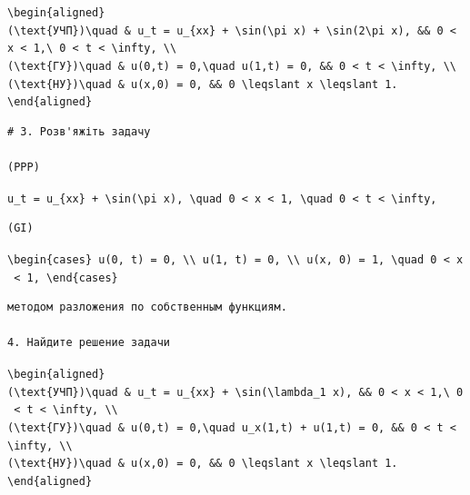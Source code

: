 \documentclass[
  ukrainian,
]{article}
\begin{document}
\texttt{\textbackslash{}begin\{aligned\}}
\texttt{(\textbackslash{}text\{УЧП\})\textbackslash{}quad\ \&\ u\_t\ =\ u\_\{xx\}\ +\ \textbackslash{}sin(\textbackslash{}pi\ x)\ +\ \textbackslash{}sin(2\textbackslash{}pi\ x),\ \&\&\ 0\ \textless{}\ x\ \textless{}\ 1,\textbackslash{}\ 0\ \textless{}\ t\ \textless{}\ \textbackslash{}infty,\ \textbackslash{}\textbackslash{}}
\texttt{(\textbackslash{}text\{ГУ\})\textbackslash{}quad\ \&\ u(0,t)\ =\ 0,\textbackslash{}quad\ u(1,t)\ =\ 0,\ \&\&\ 0\ \textless{}\ t\ \textless{}\ \textbackslash{}infty,\ \textbackslash{}\textbackslash{}}
\texttt{(\textbackslash{}text\{НУ\})\textbackslash{}quad\ \&\ u(x,0)\ =\ 0,\ \&\&\ 0\ \textbackslash{}leqslant\ x\ \textbackslash{}leqslant\ 1.}
\texttt{\textbackslash{}end\{aligned\}}

\begin{verbatim}
# 3. Розв'яжіть задачу

(PPP)
\end{verbatim}

\texttt{u\_t\ =\ u\_\{xx\}\ +\ \textbackslash{}sin(\textbackslash{}pi\ x),\ \textbackslash{}quad\ 0\ \textless{}\ x\ \textless{}\ 1,\ \textbackslash{}quad\ 0\ \textless{}\ t\ \textless{}\ \textbackslash{}infty,}

\begin{verbatim}
(GI)
\end{verbatim}

\texttt{\textbackslash{}begin\{cases\}\ u(0,\ t)\ =\ 0,\ \textbackslash{}\textbackslash{}\ u(1,\ t)\ =\ 0,\ \textbackslash{}\textbackslash{}\ u(x,\ 0)\ =\ 1,\ \textbackslash{}quad\ 0\ \textless{}\ x\ \textless{}\ 1,\ \textbackslash{}end\{cases\}}

\begin{verbatim}
методом разложения по собственным функциям.

4. Найдите решение задачи
\end{verbatim}

\texttt{\textbackslash{}begin\{aligned\}}
\texttt{(\textbackslash{}text\{УЧП\})\textbackslash{}quad\ \&\ u\_t\ =\ u\_\{xx\}\ +\ \textbackslash{}sin(\textbackslash{}lambda\_1\ x),\ \&\&\ 0\ \textless{}\ x\ \textless{}\ 1,\textbackslash{}\ 0\ \textless{}\ t\ \textless{}\ \textbackslash{}infty,\ \textbackslash{}\textbackslash{}}
\texttt{(\textbackslash{}text\{ГУ\})\textbackslash{}quad\ \&\ u(0,t)\ =\ 0,\textbackslash{}quad\ u\_x(1,t)\ +\ u(1,t)\ =\ 0,\ \&\&\ 0\ \textless{}\ t\ \textless{}\ \textbackslash{}infty,\ \textbackslash{}\textbackslash{}}
\texttt{(\textbackslash{}text\{НУ\})\textbackslash{}quad\ \&\ u(x,0)\ =\ 0,\ \&\&\ 0\ \textbackslash{}leqslant\ x\ \textbackslash{}leqslant\ 1.}
\texttt{\textbackslash{}end\{aligned\}}
\end{document}
